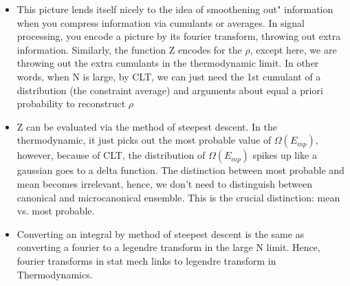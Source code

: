 \documentclass[12pt]{article}
\begin{document}
\begin{itemize}
\item This picture lends itself nicely to the idea of smoothening  out" information when you compress information via cumulants or averages.  In signal processing, you encode a picture by its fourier transform, throwing out extra information.  Similarly, the function Z encodes for the $\rho$, except here, we are throwing out the extra cumulants in the thermodynamic limit.  In other words, when N is large, by CLT, we can just need the 1st cumulant of a distribution (the constraint average) and arguments about equal a priori probability to reconstruct $\rho$

\item  Z can be evaluated via the method of steepest descent.  In the thermodynamic, it just picks out the most probable value of $\Omega (E_{mp})$, however, because of CLT, the distribution of $\Omega(E_{mp})$ spikes up like a gaussian goes to a delta function.  The distinction between most probable and mean becomes irrelevant, hence, we don't need to distinguish between canonical and microcanonical ensemble.  This is the crucial distinction: mean vs. most probable.

\item Converting an integral by method of steepest descent is the same as converting a fourier to a legendre transform in the large N limit.  Hence, fourier transforms in stat mech links to legendre transform in Thermodynamics.
\end{itemize}
\end{document}
